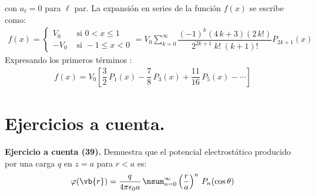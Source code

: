 con $a_{\ell} = 0$ para $\ell$ par. La expansión en series de la función $f(x)$ se escribe como:
\begin{align*}
f(x) = \begin{cases}
V_{0} & \mbox{ si } 0 < x \leq 1 \\[0.5em]
-V_{0} & \mbox{ si } -1 \leq x < 0
\end{cases}
= V_{0} \sum_{k=0}^{\infty} \dfrac{(-1)^{k}(4 \, k + 3)(2 \, k!)}{2^{2k+1} \; k! \; (k+1)!} P_{2k+1} (x)
\end{align*}
Expresando los primeros términos :
\begin{align*}
f(x) = V_{0} \left[ \dfrac{3}{2} \, P_{1}(x) - \dfrac{7}{8} \, P_{3}(x) + \dfrac{11}{16} \, P_{5}(x) - \cdots \right]
\end{align*}

\section{Ejercicios a cuenta.}


\noindent
\textbf{Ejercicio a cuenta (39). } Demuestra que el potencial electrostático producido por una carga $q$ en $z = a$ para $r < a$ es:
\begin{align*}
\varphi(\vb{r}) = \dfrac{q}{4 \pi \epsilon_{0} a} \, \nsum_{n=0}^{\infty} \left( \dfrac{r}{a} \right)^{n} \, P_{n}(\cos \theta)
\end{align*}
\\[0.5em]
\noindent

